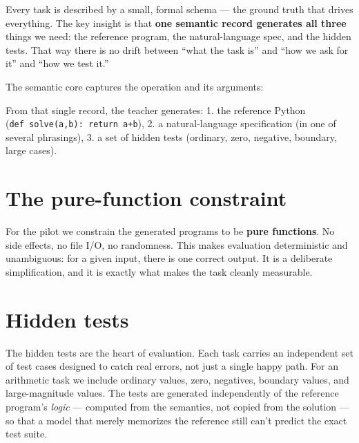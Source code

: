 Every task is described by a small, formal schema --- the ground truth
that drives everything. The key insight is that \textbf{one semantic
record generates all three} things we need: the reference program, the
natural-language spec, and the hidden tests. That way there is no drift
between ``what the task is'' and ``how we ask for it'' and ``how we test
it.''

The semantic core captures the operation and its arguments:

\begin{Shaded}
\begin{Highlighting}[]
\FunctionTok{\{}
  \FunctionTok{:} \FunctionTok{,}
  \FunctionTok{:} \OtherTok{[}\FunctionTok{\{}\FunctionTok{:} \FunctionTok{,} \FunctionTok{:} \FunctionTok{\}}\OtherTok{,} \FunctionTok{\{}\FunctionTok{:} \FunctionTok{,} \FunctionTok{:} \FunctionTok{\}}\OtherTok{]}\FunctionTok{,}
  \FunctionTok{:} 
\FunctionTok{\}}
\end{Highlighting}
\end{Shaded}

From that single record, the teacher generates: 1. the reference Python
(\texttt{def\ solve(a,b):\ return\ a+b}), 2. a natural-language
specification (in one of several phrasings), 3. a set of hidden tests
(ordinary, zero, negative, boundary, large cases).

\section{The pure-function
constraint}\label{the-pure-function-constraint}

For the pilot we constrain the generated programs to be \textbf{pure
functions}. No side effects, no file I/O, no randomness. This makes
evaluation deterministic and unambiguous: for a given input, there is
one correct output. It is a deliberate simplification, and it is exactly
what makes the task cleanly measurable.

\section{Hidden tests}\label{hidden-tests}

The hidden tests are the heart of evaluation. Each task carries an
independent set of test cases designed to catch real errors, not just a
single happy path. For an arithmetic task we include ordinary values,
zero, negatives, boundary values, and large-magnitude values. The tests
are generated independently of the reference program's \emph{logic} ---
computed from the semantics, not copied from the solution --- so that a
model that merely memorizes the reference still can't predict the exact
test suite.

